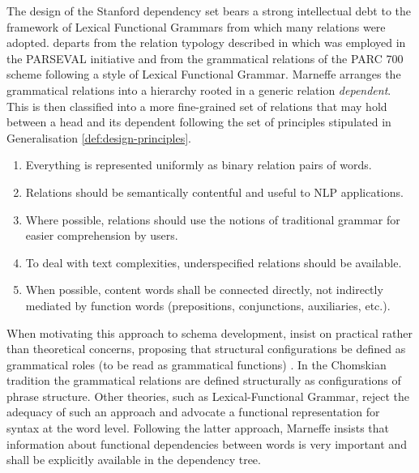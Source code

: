     The design of the Stanford dependency set \citep{Marneffe2006, Marneffe2008,  Marneffe2014, Silveira2014} bears a strong intellectual debt to the framework of Lexical Functional Grammars \citep{bresnan2015lexical} from which many relations  were adopted. \citet{Marneffe2006} departs from the relation typology described in \citet{Carroll1999} which was employed in the PARSEVAL initiative \citep{Harrison1991} and from the grammatical relations of the PARC 700 \citep{King2003} scheme following a style of Lexical Functional Grammar. Marneffe arranges the grammatical relations into a hierarchy rooted in a generic relation \textit{dependent}. This is then classified into a more fine-grained set of relations that may hold between a head and its dependent following the set of principles \citep{Marneffe2008a} stipulated in Generalisation \ref{def:design-principles}.

    \begin{generalization}\label{def:design-principles}\leavevmode
        \begin{enumerate}
            \item Everything is represented uniformly as binary relation pairs of words.
            \item Relations should be semantically contentful and useful to NLP applications.
            \item Where possible, relations should use the notions of traditional grammar \citep{Quirk1985} for easier comprehension by users.
            \item To deal with text complexities, underspecified relations should be available.
            \item When possible, content words shall be connected directly, not indirectly mediated by function words (prepositions, conjunctions, auxiliaries, etc.).
        \end{enumerate}
    \end{generalization}

    When motivating this approach to schema development, \citet{Marneffe2006} insist on practical rather than theoretical concerns, proposing that structural configurations be defined as grammatical roles (to be read as grammatical functions) \citep{Marneffe2006}. In the Chomskian tradition \citet{ Chomsky57} the grammatical relations are defined structurally as configurations of phrase structure. Other theories, such as Lexical-Functional Grammar, reject the adequacy of such an approach \citep{bresnan2015lexical} and advocate a functional representation for syntax at the word level. Following the latter approach, Marneffe insists that information about functional dependencies between words is very important and shall be explicitly available in the dependency tree. 

